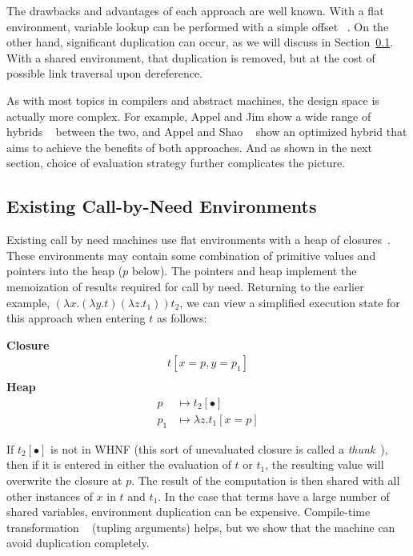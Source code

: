 The drawbacks and advantages of each approach are well known. With a flat
environment, variable lookup can be performed with a simple offset
~\cite{jonesstg,appel1992compiling}. On the other hand, significant
duplication can occur, as we will discuss in Section~\ref{sec:exist}.
With a shared environment, that duplication is removed, but at the cost of
possible link traversal upon dereference. 

As with most topics in compilers and abstract machines, the design space is
actually more complex. For example, Appel and Jim show a wide range of hybrids
~\cite{appel1988optimizing} between the two, and Appel and Shao
~\cite{shao1994space} show an optimized hybrid that aims to achieve the benefits
of both approaches. And as shown in the next section, choice of evaluation
strategy further complicates the picture.

\subsection{Existing Call-by-Need Environments} \label{sec:exist}

Existing call by need machines use flat environments with a heap of
closures~\cite{jonesstg,TIM,johnsson1984efficient,boquist1997grin}. These
environments may contain some combination of primitive values and pointers into the
heap ($p$ below). The pointers and heap implement the memoization of results
required for call by need. Returning to the earlier example, $(\lambda
x.(\lambda y.t) (\lambda z.t_1)) t_2$, we can view a simplified execution state
for this approach when entering $t$ as follows:

\begin{center}
\textbf{Closure}
\begin{align*}
t[x=p, y=p_1] \\
\end{align*}
\textbf{Heap}
\begin{align*}
p &\mapsto t_2[\bullet] \\
p_1 &\mapsto \lambda z.t_1[x=p] 
\end{align*}
\end{center}

If $t_2[\bullet]$ is not in WHNF (this sort of unevaluated closure is called a
\emph{thunk}~\cite{ingerman1961way,peyton1992implementing}), then if it is
entered in either the evaluation of $t$ or $t_1$, the resulting value will
overwrite the closure at $p$. The result of the computation is then shared with
all other instances of $x$ in $t$ and $t_1$. In the case that terms have a large
number of shared variables, environment duplication can be expensive.
Compile-time transformation ~\cite{peyton1992implementing} (tupling arguments)
helps, but we show that the machine can avoid duplication completely.

